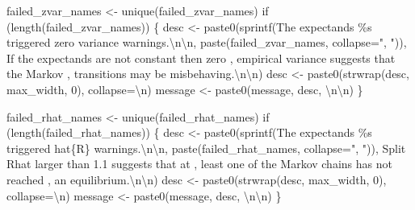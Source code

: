 \documentclass[
  letterpaper,
  DIV=11,
  numbers=noendperiod]{scrartcl}
\newenvironment{Shaded}{\begin{snugshade}}{\end{snugshade}}
\newcommand{\CharTok}[1]{\textcolor[rgb]{0.13,0.47,0.30}{#1}}
\newcommand{\ControlFlowTok}[1]{\textcolor[rgb]{0.00,0.23,0.31}{#1}}
\newcommand{\DecValTok}[1]{\textcolor[rgb]{0.68,0.00,0.00}{#1}}
\newcommand{\NormalTok}[1]{\textcolor[rgb]{0.00,0.23,0.31}{#1}}
\newcommand{\OperatorTok}[1]{\textcolor[rgb]{0.37,0.37,0.37}{#1}}
\newcommand{\SpecialCharTok}[1]{\textcolor[rgb]{0.37,0.37,0.37}{#1}}
\newcommand{\StringTok}[1]{\textcolor[rgb]{0.13,0.47,0.30}{#1}}
\begin{document}
\begin{Shaded}
\begin{Highlighting}[]
\NormalTok{  failed\_zvar\_names }\OperatorTok{\textless{}{-}}\NormalTok{ unique(failed\_zvar\_names)}
  \ControlFlowTok{if}\NormalTok{ (length(failed\_zvar\_names)) \{ }
\NormalTok{    desc }\OperatorTok{\textless{}{-}} 
\NormalTok{      paste0(sprintf(}\StringTok{\textquotesingle{}The expectands }\SpecialCharTok{\%s}\StringTok{ triggered zero variance warnings.}\CharTok{\textbackslash{}n\textbackslash{}n}\StringTok{\textquotesingle{}}\NormalTok{,}
\NormalTok{             paste(failed\_zvar\_names, collapse}\OperatorTok{=}\StringTok{", "}\NormalTok{)),}
             \StringTok{\textquotesingle{}  If the expectands are not constant then zero \textquotesingle{}}\NormalTok{,}
             \StringTok{\textquotesingle{}empirical variance suggests that the Markov \textquotesingle{}}\NormalTok{,}
             \StringTok{\textquotesingle{}transitions may be misbehaving.}\CharTok{\textbackslash{}n\textbackslash{}n}\StringTok{\textquotesingle{}}\NormalTok{)}
\NormalTok{    desc }\OperatorTok{\textless{}{-}}\NormalTok{ paste0(strwrap(desc, max\_width, }\DecValTok{0}\NormalTok{), collapse}\OperatorTok{=}\StringTok{\textquotesingle{}}\CharTok{\textbackslash{}n}\StringTok{\textquotesingle{}}\NormalTok{)}
\NormalTok{    message }\OperatorTok{\textless{}{-}}\NormalTok{ paste0(message, desc, }\StringTok{\textquotesingle{}}\CharTok{\textbackslash{}n\textbackslash{}n}\StringTok{\textquotesingle{}}\NormalTok{)}
\NormalTok{  \}}
  
\NormalTok{  failed\_rhat\_names }\OperatorTok{\textless{}{-}}\NormalTok{ unique(failed\_rhat\_names)}
  \ControlFlowTok{if}\NormalTok{ (length(failed\_rhat\_names)) \{}
\NormalTok{    desc }\OperatorTok{\textless{}{-}} 
\NormalTok{      paste0(sprintf(}\StringTok{\textquotesingle{}The expectands }\SpecialCharTok{\%s}\StringTok{ triggered hat}\SpecialCharTok{\{R\}}\StringTok{ warnings.}\CharTok{\textbackslash{}n\textbackslash{}n}\StringTok{\textquotesingle{}}\NormalTok{,}
\NormalTok{             paste(failed\_rhat\_names, collapse}\OperatorTok{=}\StringTok{", "}\NormalTok{)),}
             \StringTok{\textquotesingle{}  Split Rhat larger than 1.1 suggests that at \textquotesingle{}}\NormalTok{,}
             \StringTok{\textquotesingle{}least one of the Markov chains has not reached \textquotesingle{}}\NormalTok{,}
             \StringTok{\textquotesingle{}an equilibrium.}\CharTok{\textbackslash{}n\textbackslash{}n}\StringTok{\textquotesingle{}}\NormalTok{)}
\NormalTok{    desc }\OperatorTok{\textless{}{-}}\NormalTok{ paste0(strwrap(desc, max\_width, }\DecValTok{0}\NormalTok{), collapse}\OperatorTok{=}\StringTok{\textquotesingle{}}\CharTok{\textbackslash{}n}\StringTok{\textquotesingle{}}\NormalTok{)}
\NormalTok{    message }\OperatorTok{\textless{}{-}}\NormalTok{ paste0(message, desc, }\StringTok{\textquotesingle{}}\CharTok{\textbackslash{}n\textbackslash{}n}\StringTok{\textquotesingle{}}\NormalTok{)}
\NormalTok{  \}}
  

\end{Highlighting}
\end{Shaded}
\end{document}

